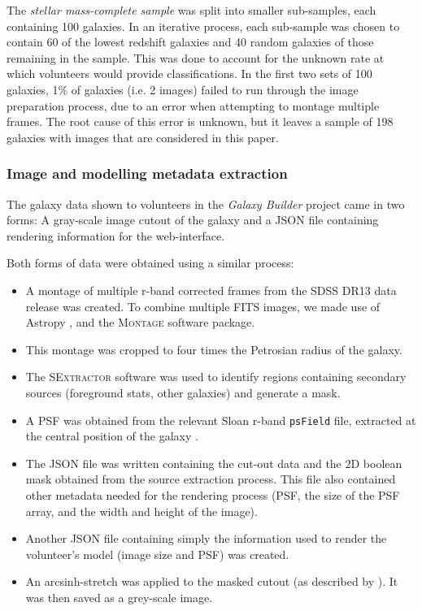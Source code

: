 \documentclass[../main.tex]{subfiles}
\begin{document}
The \textit{stellar mass-complete sample} was split into smaller sub-samples, each containing 100 galaxies. In an iterative process, each sub-sample was chosen to contain 60 of the lowest redshift galaxies and 40 random galaxies of those remaining in the sample. This was done to account for the unknown rate at which volunteers would provide classifications. In the first two sets of 100 galaxies, 1\% of galaxies (i.e. 2 images) failed to run through the image preparation process, due to an error when attempting to montage multiple frames. The root cause of this error is unknown, but it leaves a sample of 198 galaxies with images that are considered in this paper.

\subsubsection{Image and modelling metadata extraction}

The galaxy data shown to volunteers in the \textit{Galaxy Builder} project came in two forms: A gray-scale image cutout of the galaxy and a JSON file containing rendering information for the web-interface.

Both forms of data were obtained using a similar process:

\begin{itemize}
\item A montage of multiple r-band corrected frames from the SDSS DR13 \citep{2017ApJS..233...25A} data release was created. To combine multiple FITS images, we made use of Astropy \citep{2018AJ....156..123T}, and the \textsc{Montage} \citep{2010arXiv1005.4454J} software package.
\item This montage was cropped to four times the Petrosian radius of the galaxy.
\item The \textsc{SExtractor} software \citep{source-extractor} was used to identify regions containing secondary sources (foreground stats, other galaxies) and generate a mask.
\item A PSF was obtained from the relevant Sloan r-band \texttt{psField} file, extracted at the central position of the galaxy \citep{2002AJ....123..485S}.
\item The JSON file was written containing the cut-out data and the 2D boolean mask obtained from the source extraction process. This file also contained other metadata needed for the rendering process (PSF, the size of the PSF array, and the width and height of the image).
\item Another JSON file containing simply the information used to render the volunteer's model (image size and PSF) was created.
\item An arcsinh-stretch was applied to the masked cutout (as described by \citealt{Lupton2003:astro-ph/0312483v1}). It was then saved as a grey-scale image.
\end{itemize}
\end{document}
